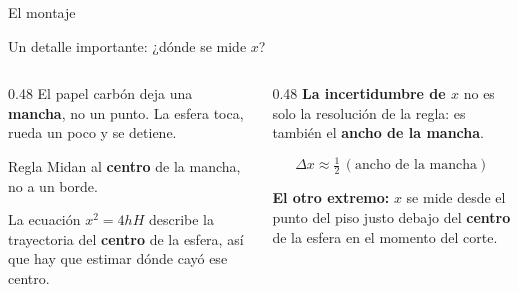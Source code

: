 \documentclass[aspectratio=169,xcolor=dvipsnames]{beamer}
\begin{document}
\begin{frame}{El montaje}
\begin{center}
		\end{center}
		
	\end{frame}
	
	\begin{frame}{Un detalle importante: ¿dónde se mide $x$?}
		\begin{columns}[T]
			\begin{column}{0.48\textwidth}
				\small
				El papel carbón deja una \textbf{mancha}, no un punto. La esfera
				toca, rueda un poco y se detiene.
				
				\vspace{0.3cm}
				\begin{alertblock}{Regla}
					\centering
					Midan al \textbf{centro} de la mancha, no a un borde.
				\end{alertblock}
				
				\vspace{0.3cm}
				La ecuación $x^2=4hH$ describe la trayectoria del \textbf{centro}
				de la esfera, así que hay que estimar dónde cayó ese centro.
			\end{column}
			\begin{column}{0.48\textwidth}
				\small
				\textbf{La incertidumbre de $x$} no es solo la resolución de la
				regla: es también el \textbf{ancho de la mancha}.
				
				\vspace{0.2cm}
				\[
				\Delta x \approx \tfrac{1}{2}\,(\text{ancho de la mancha})
				\]
				
				\vspace{0.3cm}
				\textbf{El otro extremo:} $x$ se mide desde el punto del piso
				justo debajo del \textbf{centro} de la esfera en el momento del
				corte.
			\end{column}
		\end{columns}
	\end{frame}
	
\end{document}
